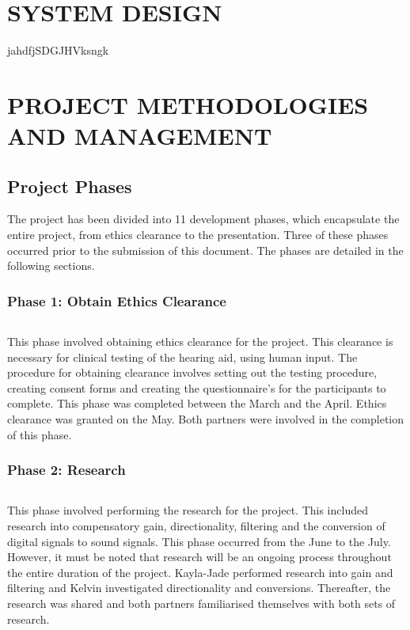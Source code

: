 \documentclass[10pt,twocolumn]{witseiepaper}
\begin{document}
\section{SYSTEM DESIGN}

jahdfjSDGJHVksngk
\section{PROJECT METHODOLOGIES AND MANAGEMENT}
\subsection{Project Phases}
The project has been divided into 11 development phases, which encapsulate the entire project, from ethics clearance to the presentation. Three of these phases occurred prior to the submission of this document. The phases are detailed in the following sections.

\subsubsection*{Phase 1: Obtain Ethics Clearance} $    $

This phase involved obtaining ethics clearance for the project. This clearance is necessary for clinical testing of the hearing aid, using human input. The procedure for obtaining clearance involves setting out the testing procedure, creating consent forms and creating the questionnaire's for the participants to complete. This phase was completed between the  March and the  April. Ethics clearance was granted on the  May. Both partners were involved in the completion of this phase.

\subsubsection*{Phase 2: Research} $    $

This phase involved performing the research for the project. This included research into compensatory gain, directionality, filtering and the conversion of digital signals to sound signals. This phase occurred from the  June to the  July. However, it must be noted that research will be an ongoing process throughout the entire duration of the project. Kayla-Jade performed research into gain and filtering and Kelvin investigated directionality and conversions. Thereafter, the research was shared and both partners familiarised themselves with both sets of research.
\end{document}
